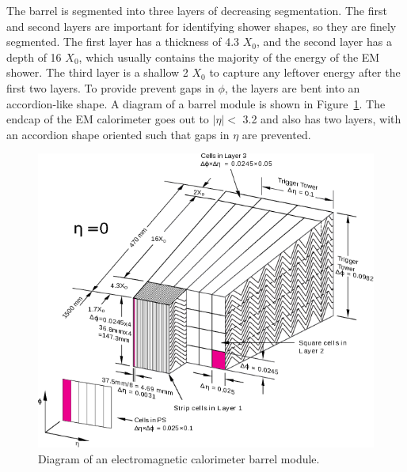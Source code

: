 The barrel is segmented into three layers of decreasing segmentation. The first and second layers are important for identifying shower shapes, so they are finely segmented. The first layer has a thickness of 4.3 $X_0$, and the second layer has a depth of 16 $X_0$, which usually contains the majority of the energy of the EM shower. The third layer is a shallow 2 $X_0$ to capture any leftover energy after the first two layers. To provide prevent gaps in $\phi$, the layers are bent into an accordion-like shape. A diagram of a barrel module is shown in Figure~\ref{fig:caloModule}. The endcap of the EM calorimeter goes out to $|\eta|<$ 3.2 and also has two layers, with an accordion shape oriented such that gaps in $\eta$ are prevented.




\begin{figure}[h]
\begin{minipage}[b]{0.48\textwidth}
\includegraphics[width=\textwidth]{fig/atlas/caloModule.png}
\caption{Diagram of an electromagnetic calorimeter barrel module\cite{cern-jinst-atlas}.}
\label{fig:caloModule}
\end{minipage}
\hfill
\begin{minipage}[b]{0.48\textwidth}

\end{minipage}
\end{figure}
